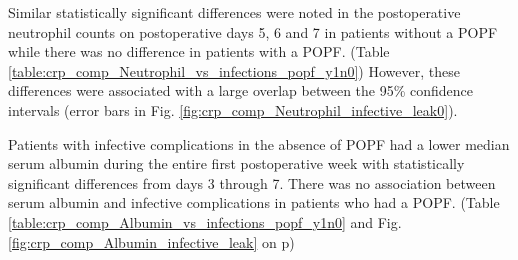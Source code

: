 Similar statistically significant differences were noted in the postoperative neutrophil counts on postoperative days 5, 6 and 7 in patients without a POPF while there was no difference in patients with a POPF. (Table \ref{table:crp_comp_Neutrophil_vs_infections_popf_y1n0})	However, these differences were associated with a large overlap between the 95\% confidence intervals (error bars in Fig. \ref{fig:crp_comp_Neutrophil_infective_leak0}).

Patients with infective complications in the absence of POPF had a lower median serum albumin  during the entire first postoperative week with statistically significant differences from days 3 through 7. There was no association between serum albumin and infective complications in patients who had a POPF. (Table \ref{table:crp_comp_Albumin_vs_infections_popf_y1n0} and Fig. \ref{fig:crp_comp_Albumin_infective_leak} on p\pageref{fig:crp_comp_Albumin_infective_leak})

